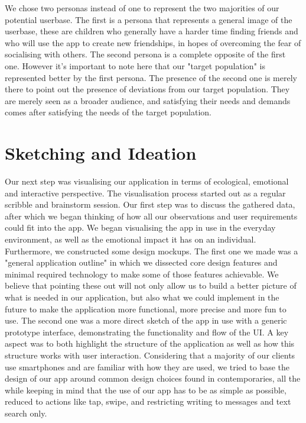 \documentclass[12pt]{report}
\begin{document}
	\newpage
	We chose two personas instead of one to represent the two majorities of our potential userbase. The first is a persona that represents a general image of the userbase, these are children who generally have a harder time finding friends and who will use the app to create new friendships, in hopes of overcoming the fear of socialising with others. The second persona is a complete opposite of the first one. However it's important to note here that our "target population" is represented better by the first persona. The presence of the second one is merely there to point out the presence of deviations from our target population. They are merely seen as a broader audience, and satisfying their needs and demands comes after satisfying the needs of the target population. 
	
	\section*{\huge Sketching and Ideation}
	Our next step was visualising our application in terms of ecological, emotional and interactive perspective. The visualisation process started out as a regular scribble and brainstorm session. Our first step was to discuss the gathered data, after which we began thinking of how all our observations and user requirements could fit into the app. We began visualising the app in use in the everyday environment, as well as the emotional impact it has on an individual. Furthermore, we constructed some design mockups. The first one we made was a "general application outline" in which we dissected core design features and minimal required technology to make some of those features achievable. We believe that pointing these out will not only allow us to build a better picture of what is needed in our application, but also what we could implement in the future to make the application more functional, more precise and more fun to use. The second one was a more direct sketch of the app in use with a generic prototype interface, demonstrating the functionality and flow of the UI. A key aspect was to both highlight the structure of the application as well as how this structure works with user interaction. Considering that a majority of our clients use smartphones and are familiar with how they are used, we tried to base the design of our app around common design choices found in contemporaries, all the while keeping in mind that the use of our app has to be as simple as possible, reduced to actions like tap, swipe, and restricting writing to messages and text search only.
	
\end{document}
